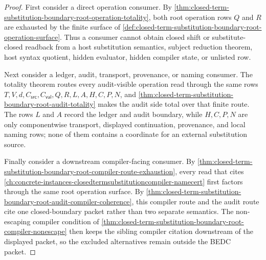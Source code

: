 \begin{proof}
First consider a direct operation consumer. By \autoref{thm:closed-term-substitution-boundary-root-operation-totality}, both root operation rows $Q$ and $R$ are exhausted by the finite surface of \autoref{def:closed-term-substitution-boundary-root-operation-surface}. Thus a consumer cannot obtain closed shift or substitute-closed readback from a host substitution semantics, subject reduction theorem, host syntax quotient, hidden evaluator, hidden compiler state, or unlisted row.

Next consider a ledger, audit, transport, provenance, or naming consumer. The totality theorem routes every audit-visible operation read through the same rows $T,V,d,C_{\mathsf{src}},C_{\mathsf{val}},Q,R,L,A,H,C,P,N$, and \autoref{thm:closed-term-substitution-boundary-root-audit-totality} makes the audit side total over that finite route. The rows $L$ and $A$ record the ledger and audit boundary, while $H,C,P,N$ are only componentwise transport, displayed continuation, provenance, and local naming rows; none of them contains a coordinate for an external substitution source.

Finally consider a downstream compiler-facing consumer. By \autoref{thm:closed-term-substitution-boundary-root-compiler-route-exhaustion}, every read that cites \autoref{ch:concrete-instances-closedtermsubstitutioncompiler-namecert} first factors through the same root operation surface. By \autoref{thm:closed-term-substitution-boundary-root-audit-compiler-coherence}, this compiler route and the audit route cite one closed-boundary packet rather than two separate semantics. The non-escaping compiler condition of \autoref{thm:closed-term-substitution-boundary-root-compiler-nonescape} then keeps the sibling compiler citation downstream of the displayed packet, so the excluded alternatives remain outside the BEDC packet.
\end{proof}
